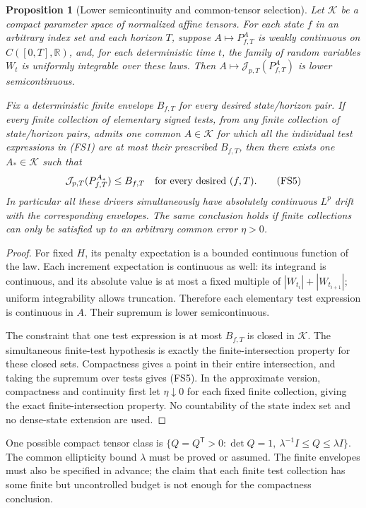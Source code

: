\documentclass[11pt]{article}
\newtheorem{proposition}[theorem]{Proposition}
\theoremstyle{definition}\newtheorem{definition}[theorem]{Definition}
\theoremstyle{remark}\newtheorem{remark}[theorem]{Remark}
\begin{document}
\begin{proposition}[Lower semicontinuity and common-tensor selection]
\label{prop:finite-affine-selection}
Let $\mathcal K$ be a compact parameter space of normalized affine
tensors. For each state $f$ in an arbitrary index set and each
horizon $T$, suppose $A\mapsto P_{f,T}^A$ is weakly continuous on
$C([0,T],\mathbb R)$, and, for each deterministic time $t$, the
family of random variables $W_t$ is uniformly integrable over these
laws. Then $A\mapsto\mathcal J_{p,T}(P_{f,T}^A)$ is lower
semicontinuous.

Fix a deterministic finite envelope $B_{f,T}$ for every desired
state/horizon pair. If every finite collection of elementary signed
tests, from any finite collection of state/horizon pairs, admits
one common $A\in\mathcal K$ for which all the individual test
expressions in (FS1) are at most their prescribed $B_{f,T}$, then
there exists one $A_*\in\mathcal K$ such that
\[
 \mathcal J_{p,T}(P_{f,T}^{A_*})\le B_{f,T}
 \quad\hbox{for every desired }(f,T).
 \tag{FS5}
\]
In particular all these drivers simultaneously have absolutely
continuous $L^p$ drift with the corresponding envelopes.
The same conclusion holds if finite collections can only be satisfied
up to an arbitrary common error $\eta>0$.
\end{proposition}
\begin{proof}
For fixed $H$, its penalty expectation is a bounded continuous
function of the law. Each increment expectation is continuous as
well: its integrand is continuous, and its absolute value is at
most a fixed multiple of $|W_{t_i}|+|W_{t_{i+1}}|$; uniform
integrability allows truncation. Therefore each elementary test
expression is continuous in $A$. Their supremum is lower
semicontinuous.

The constraint that one test expression is at most $B_{f,T}$ is
closed in $\mathcal K$. The simultaneous finite-test hypothesis is
exactly the finite-intersection property for these closed sets.
Compactness gives a point in their entire intersection, and taking
the supremum over tests gives (FS5). In the approximate version,
compactness and continuity first let $\eta\downarrow0$ for each fixed
finite collection, giving the exact finite-intersection property.
No countability of the state
index set and no dense-state extension are used.
\end{proof}

One possible compact tensor class is
$\{Q=Q^{\mathsf T}>0:\det Q=1,\ \lambda^{-1}I\le Q\le\lambda I\}$.
The common ellipticity bound $\lambda$ must be proved or assumed.
The finite envelopes must also be specified in advance; the claim
that each finite test collection has some finite but uncontrolled
budget is not enough for the compactness conclusion.
\end{document}
